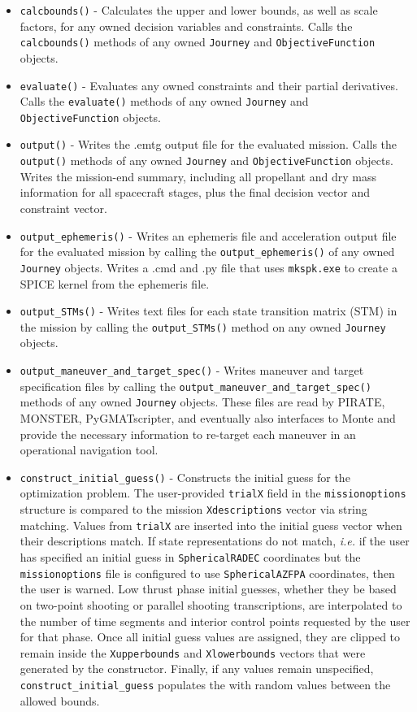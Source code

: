 \begin{itemize}
	\item \texttt{calcbounds()} - Calculates the upper and lower bounds, as well as scale factors, for any owned decision variables and constraints. Calls the \texttt{calcbounds()} methods of any owned \texttt{Journey} and \texttt{ObjectiveFunction} objects.
	\item \texttt{evaluate()} - Evaluates any owned constraints and their partial derivatives. Calls the \texttt{evaluate()} methods of any owned \texttt{Journey} and \texttt{ObjectiveFunction} objects.
	\item \texttt{output()} - Writes the .emtg output file for the evaluated mission. Calls the \texttt{output()} methods of any owned \texttt{Journey} and \texttt{ObjectiveFunction} objects. Writes the mission-end summary, including all propellant and dry mass information for all spacecraft stages, plus the final decision vector and constraint vector.
	\item \texttt{output\_ephemeris()} - Writes an ephemeris file and acceleration output file for the evaluated mission by calling the \texttt{output\_ephemeris()} of any owned \texttt{Journey} objects. Writes a .cmd and .py file that uses \texttt{mkspk.exe} to create a SPICE kernel from the ephemeris file.
	\item \texttt{output\_STMs()} - Writes text files for each state transition matrix (STM) in the mission by calling the \texttt{output\_STMs()} method on any owned \texttt{Journey} objects.
	\item \texttt{output\_maneuver\_and\_target\_spec()} - Writes maneuver and target specification files by calling the \texttt{output\_maneuver\_and\_target\_spec()} methods of any owned \texttt{Journey} objects. These files are read by PIRATE, MONSTER, PyGMATscripter, and eventually also interfaces to Monte and provide the necessary information to re-target each maneuver in an operational navigation tool.
	\item \texttt{construct\_initial\_guess()} - Constructs the initial guess for the optimization problem. The user-provided \texttt{trialX} field in the \texttt{missionoptions} structure is compared to the mission \texttt{Xdescriptions} vector via string matching. Values from \texttt{trialX} are inserted into the initial guess vector when their descriptions match. If state representations do not match, \textit{i.e.} if the user has specified an initial guess in \texttt{SphericalRADEC} coordinates but the \texttt{missionoptions} file is configured to use \texttt{SphericalAZFPA} coordinates, then the user is warned. Low thrust phase initial guesses, whether they be based on two-point shooting or parallel shooting transcriptions, are interpolated to the number of time segments and interior control points requested by the user for that phase. Once all initial guess values are assigned, they are clipped to remain inside the \texttt{Xupperbounds} and \texttt{Xlowerbounds} vectors that were generated by the constructor. Finally, if any values remain unspecified, \texttt{construct\_initial\_guess} populates the with random values between the allowed bounds.

\end{itemize}
